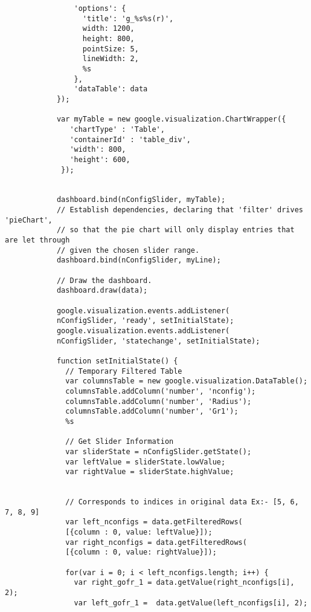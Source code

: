 \begin{verbatim}
                'options': {
                  'title': 'g_%s%s(r)',
                  width: 1200, 
                  height: 800, 
                  pointSize: 5, 
                  lineWidth: 2,
                  %s
                },
                'dataTable': data
            });
           
            var myTable = new google.visualization.ChartWrapper({
               'chartType' : 'Table',
               'containerId' : 'table_div',
               'width': 800,
               'height': 600,
             });
             
            
            dashboard.bind(nConfigSlider, myTable);
            // Establish dependencies, declaring that 'filter' drives 'pieChart',
            // so that the pie chart will only display entries that are let through
            // given the chosen slider range.
            dashboard.bind(nConfigSlider, myLine);

            // Draw the dashboard.
            dashboard.draw(data);
            
            google.visualization.events.addListener(
            nConfigSlider, 'ready', setInitialState);
            google.visualization.events.addListener(
            nConfigSlider, 'statechange', setInitialState);
            
            function setInitialState() {
              // Temporary Filtered Table
              var columnsTable = new google.visualization.DataTable();
              columnsTable.addColumn('number', 'nconfig');
              columnsTable.addColumn('number', 'Radius');
              columnsTable.addColumn('number', 'Gr1');
              %s
              
              // Get Slider Information
              var sliderState = nConfigSlider.getState();
              var leftValue = sliderState.lowValue;
              var rightValue = sliderState.highValue;
              
            
              // Corresponds to indices in original data Ex:- [5, 6, 7, 8, 9]
              var left_nconfigs = data.getFilteredRows(
              [{column : 0, value: leftValue}]);
              var right_nconfigs = data.getFilteredRows(
              [{column : 0, value: rightValue}]);
              
              for(var i = 0; i < left_nconfigs.length; i++) {
                var right_gofr_1 = data.getValue(right_nconfigs[i], 2);
                var left_gofr_1 =  data.getValue(left_nconfigs[i], 2); 
                

\end{verbatim}
